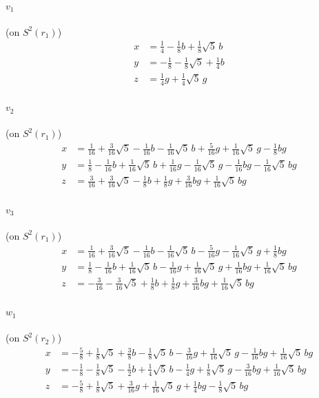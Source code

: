 \documentclass[11pt]{article}
\renewcommand{\_}{\textunderscore\allowbreak}
\theoremstyle{remark}
\begin{document}
{\scriptsize
\paragraph{$v_{1}$} (on $S^2(r_1)$)
\begin{align*}
x&=\tfrac{1}{4}-\tfrac{1}{8}b+\tfrac{1}{8}\sqrt5\,b\\
y&=-\tfrac{1}{8}-\tfrac{1}{8}\sqrt5+\tfrac{1}{4}b\\
z&=\tfrac{1}{4}g+\tfrac{1}{4}\sqrt5\,g
\end{align*}

\paragraph{$v_{2}$} (on $S^2(r_1)$)
\begin{align*}
x&=\tfrac{1}{16}+\tfrac{3}{16}\sqrt5-\tfrac{1}{16}b-\tfrac{1}{16}\sqrt5\,b+\tfrac{5}{16}g+\tfrac{1}{16}\sqrt5\,g-\tfrac{1}{8}bg\\
y&=\tfrac{1}{8}-\tfrac{1}{16}b+\tfrac{1}{16}\sqrt5\,b+\tfrac{1}{16}g-\tfrac{1}{16}\sqrt5\,g-\tfrac{1}{16}bg-\tfrac{1}{16}\sqrt5\,bg\\
z&=\tfrac{3}{16}+\tfrac{3}{16}\sqrt5-\tfrac{1}{8}b+\tfrac{1}{8}g+\tfrac{3}{16}bg+\tfrac{1}{16}\sqrt5\,bg
\end{align*}

\paragraph{$v_{3}$} (on $S^2(r_1)$)
\begin{align*}
x&=\tfrac{1}{16}+\tfrac{3}{16}\sqrt5-\tfrac{1}{16}b-\tfrac{1}{16}\sqrt5\,b-\tfrac{5}{16}g-\tfrac{1}{16}\sqrt5\,g+\tfrac{1}{8}bg\\
y&=\tfrac{1}{8}-\tfrac{1}{16}b+\tfrac{1}{16}\sqrt5\,b-\tfrac{1}{16}g+\tfrac{1}{16}\sqrt5\,g+\tfrac{1}{16}bg+\tfrac{1}{16}\sqrt5\,bg\\
z&=-\tfrac{3}{16}-\tfrac{3}{16}\sqrt5+\tfrac{1}{8}b+\tfrac{1}{8}g+\tfrac{3}{16}bg+\tfrac{1}{16}\sqrt5\,bg
\end{align*}

\paragraph{$w_{1}$} (on $S^2(r_2)$)
\begin{align*}
x&=-\tfrac{5}{8}+\tfrac{1}{8}\sqrt5+\tfrac{3}{8}b-\tfrac{1}{8}\sqrt5\,b-\tfrac{3}{16}g+\tfrac{1}{16}\sqrt5\,g-\tfrac{1}{16}bg+\tfrac{1}{16}\sqrt5\,bg\\
y&=-\tfrac{1}{8}-\tfrac{1}{8}\sqrt5-\tfrac{1}{2}b+\tfrac{1}{4}\sqrt5\,b-\tfrac{1}{4}g+\tfrac{1}{8}\sqrt5\,g-\tfrac{3}{16}bg+\tfrac{1}{16}\sqrt5\,bg\\
z&=-\tfrac{5}{8}+\tfrac{1}{8}\sqrt5+\tfrac{3}{16}g+\tfrac{1}{16}\sqrt5\,g+\tfrac{1}{4}bg-\tfrac{1}{8}\sqrt5\,bg
\end{align*}

}
\end{document}
